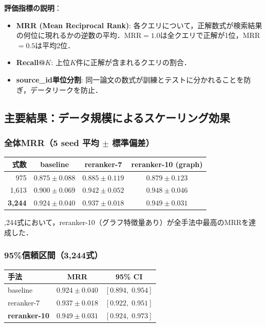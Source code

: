 \documentclass[11pt,a4paper]{ltjsarticle}
\begin{document}
\textbf{評価指標の説明}：
\begin{itemize}[nosep]
  \item \textbf{MRR (Mean Reciprocal Rank)}: 各クエリについて，正解数式が検索結果の何位に現れるかの逆数の平均．MRR$=1.0$は全クエリで正解が1位，MRR$=0.5$は平均2位．
  \item \textbf{Recall@$K$}: 上位$K$件に正解が含まれるクエリの割合．
  \item \textbf{source\_id単位分割}: 同一論文の数式が訓練とテストに分かれることを防ぎ，データリークを防止．
\end{itemize}

\subsection{主要結果：データ規模によるスケーリング効果}

\subsubsection{全体MRR（5 seed 平均 $\pm$ 標準偏差）}

\begin{table}[h]
\centering
\begin{tabular}{rccc}
\toprule
式数 & baseline & reranker-7 & reranker-10 (graph) \\
\midrule
975 & $0.875 \pm 0.088$ & $0.885 \pm 0.119$ & $0.879 \pm 0.123$ \\
1,613 & $0.900 \pm 0.069$ & $0.942 \pm 0.052$ & $0.948 \pm 0.046$ \\
\textbf{3,244} & $0.924 \pm 0.040$ & $0.937 \pm 0.018$ & $\mathbf{0.949 \pm 0.031}$ \\
\bottomrule
\end{tabular}
\end{table}

,244式において，reranker-10（グラフ特徴量あり）が全手法中最高のMRRを達成した．

\subsubsection{95\%信頼区間（3,244式）}

\begin{table}[h]
\centering
\begin{tabular}{lcc}
\toprule
手法 & MRR & 95\% CI \\
\midrule
baseline & $0.924 \pm 0.040$ & $[0.894,\; 0.954]$ \\
reranker-7 & $0.937 \pm 0.018$ & $[0.922,\; 0.951]$ \\
\textbf{reranker-10} & $\mathbf{0.949 \pm 0.031}$ & $\mathbf{[0.924,\; 0.973]}$ \\
\bottomrule
\end{tabular}
\end{table}
\end{document}
